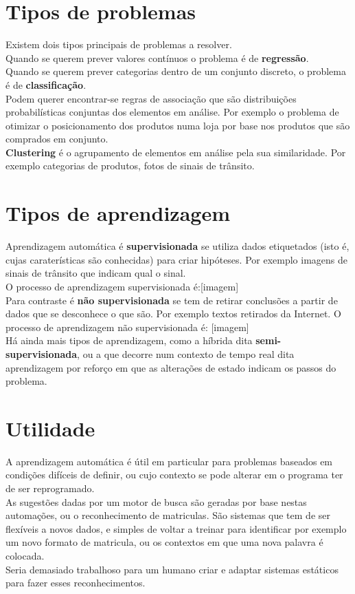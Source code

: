 \documentclass[]{report}
\begin{document}
\section{Tipos de problemas}
Existem dois tipos principais de problemas a resolver.\\
Quando se querem prever valores contínuos o problema é de \textbf{regressão}.\\
Quando se querem prever categorias dentro de um conjunto discreto, o problema é de \textbf{classificação}.\\[0.2cm]
Podem querer encontrar-se regras de associação que são distribuições probabilísticas conjuntas dos elementos em análise.
Por exemplo o problema de otimizar o posicionamento dos produtos numa loja por base nos produtos que são comprados em conjunto.\\[0.2cm]
\textbf{Clustering} é o agrupamento de elementos em análise pela sua similaridade.
Por exemplo categorias de produtos, fotos de sinais de trânsito.
\section{Tipos de aprendizagem}
Aprendizagem automática é \textbf{supervisionada} se utiliza dados etiquetados (isto é, cujas caraterísticas são conhecidas) para criar hipóteses.
Por exemplo imagens de sinais de trânsito que indicam qual o sinal.\\
O processo de aprendizagem supervisionada é:[imagem]\\[0.2cm]
Para contraste é \textbf{não supervisionada} se tem de retirar conclusões a partir de dados que se desconhece o que são.
Por exemplo textos retirados da Internet.
O processo de aprendizagem não supervisionada é: [imagem]\\[0.2cm]
Há ainda mais tipos de aprendizagem, como a híbrida dita \textbf{semi-supervisionada}, ou a que decorre num contexto de tempo real dita aprendizagem por reforço em que as alterações de estado indicam os passos do problema.
\section{Utilidade}
A aprendizagem automática é útil em particular para problemas baseados em condições difíceis de definir, ou cujo contexto se pode alterar em o programa ter de ser reprogramado.\\
As sugestões dadas por um motor de busca são geradas por base nestas automações, ou o reconhecimento de matriculas. São sistemas que tem de ser flexíveis a novos dados, e simples de voltar a treinar para identificar por exemplo um novo formato de matricula, ou os contextos em que uma nova palavra é colocada.\\
Seria demasiado trabalhoso para um humano criar e adaptar sistemas estáticos para fazer esses reconhecimentos.
\end{document}
